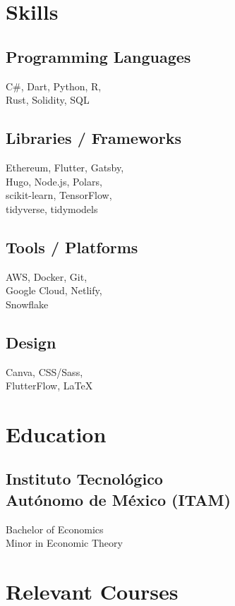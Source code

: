 \documentclass[]{resume}
\begin{document}
\begin{minipage}[t]{0.25\textwidth} 


\section{Skills}
\subsection{Programming Languages}
\sectionsep
C\#,
Dart,
Python,
R, \\
Rust,
Solidity,
SQL
\sectionsep
\sectionsep
\subsection{Libraries / Frameworks}
\sectionsep
Ethereum,
Flutter,
Gatsby, \\
Hugo,
Node.js,
Polars, \\
scikit-learn,
TensorFlow, \\
tidyverse,
tidymodels
\sectionsep
\sectionsep
\subsection{Tools / Platforms}
AWS,
Docker,
Git, \\
Google Cloud,
Netlify, \\
Snowflake
\sectionsep
\sectionsep
\subsection{Design}
Canva,
CSS/Sass, \\
FlutterFlow,
LaTeX
\sectionsep
\sectionsep


\section{Education} 
\subsection{Instituto Tecnológico \\ Autónomo de México (ITAM)}
\sectionsep
Bachelor of Economics \\
Minor in Economic Theory \\
\sectionsep
\sectionsep


\section{Relevant Courses} 

\end{minipage}
\end{document}
